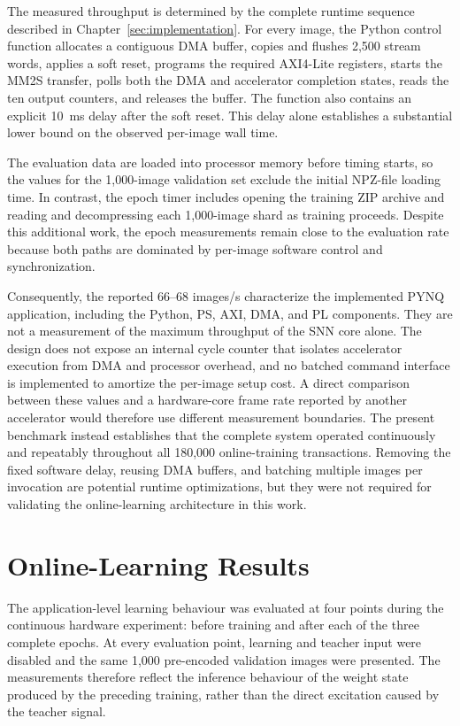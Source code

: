 The measured throughput is determined by the complete runtime sequence described in Chapter~\ref{sec:implementation}. For every image, the Python control function allocates a contiguous DMA buffer, copies and flushes 2,500 stream words, applies a soft reset, programs the required AXI4-Lite registers, starts the MM2S transfer, polls both the DMA and accelerator completion states, reads the ten output counters, and releases the buffer. The function also contains an explicit 10~ms delay after the soft reset. This delay alone establishes a substantial lower bound on the observed per-image wall time.

The evaluation data are loaded into processor memory before timing starts, so the values for the 1,000-image validation set exclude the initial NPZ-file loading time. In contrast, the epoch timer includes opening the training ZIP archive and reading and decompressing each 1,000-image shard as training proceeds. Despite this additional work, the epoch measurements remain close to the evaluation rate because both paths are dominated by per-image software control and synchronization.

Consequently, the reported 66--68 images/s characterize the implemented PYNQ application, including the Python, PS, AXI, DMA, and PL components. They are not a measurement of the maximum throughput of the SNN core alone. The design does not expose an internal cycle counter that isolates accelerator execution from DMA and processor overhead, and no batched command interface is implemented to amortize the per-image setup cost. A direct comparison between these values and a hardware-core frame rate reported by another accelerator would therefore use different measurement boundaries. The present benchmark instead establishes that the complete system operated continuously and repeatably throughout all 180,000 online-training transactions. Removing the fixed software delay, reusing DMA buffers, and batching multiple images per invocation are potential runtime optimizations, but they were not required for validating the online-learning architecture in this work.

\section{Online-Learning Results}
\label{subsec:online-learning-results}

The application-level learning behaviour was evaluated at four points during the continuous hardware experiment: before training and after each of the three complete epochs. At every evaluation point, learning and teacher input were disabled and the same 1,000 pre-encoded validation images were presented. The measurements therefore reflect the inference behaviour of the weight state produced by the preceding training, rather than the direct excitation caused by the teacher signal.

